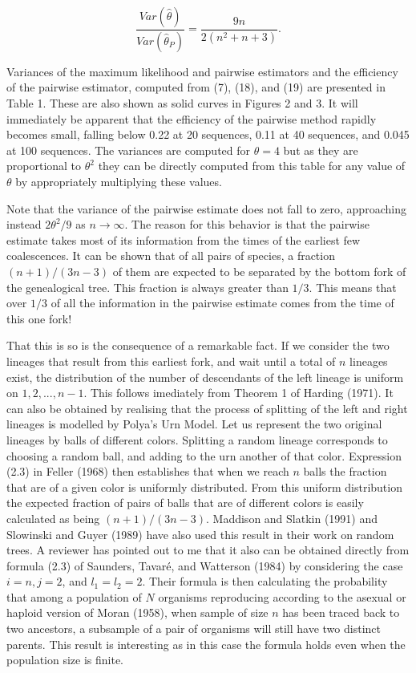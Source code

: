 \begin{equation} %
 \frac{Var(\hat{\theta})}{Var(\hat{\theta}_P)} = \frac{9n}{2(n^2+n+3)}.
\end{equation}

Variances of the maximum likelihood and pairwise estimators
and the efficiency of the pairwise estimator, computed from (7), (18), and (19)
are presented in Table 1.  These are also shown as
solid curves in Figures 2 and 3.  It will immediately be apparent that the
efficiency of the pairwise method rapidly becomes small, falling below 0.22
at 20 sequences, 0.11 at 40 sequences, and 0.045 at 100 sequences.
The variances are computed for $\theta = 4$ but as they are proportional
to $\theta^2$ they can be directly computed from this table for any value
of $\theta$ by appropriately multiplying these values.

Note that the variance of the pairwise estimate does not fall to zero,
approaching instead $2\theta^2/9$ as $n \to \infty$.  The reason for
this behavior is that the pairwise estimate takes most of its
information from the times of the earliest few coalescences.  It can be
shown that of all pairs of species, a fraction $(n+1)/(3n-3)$ of them
are expected to be separated by the bottom fork of the genealogical
tree.  This fraction is always greater than $1/3$.  This means that
over $1/3$ of all the information in the pairwise estimate comes from the
time of this one fork!

That this is so is the consequence of a remarkable fact.  If we consider
the two lineages that result from this earliest fork, and wait until a
total of $n$ lineages exist, the distribution of the number of
descendants of the left lineage is uniform on $1, 2, ..., n-1$.  This
follows imediately from Theorem 1 of Harding (1971).  It can also be
obtained by realising that the process of splitting of the left and
right lineages is modelled by Polya's Urn Model.  Let us represent the
two original lineages by balls of different colors.  Splitting a random
lineage corresponds to choosing a random ball, and adding to the urn
another of that color.  Expression (2.3) in Feller (1968) then
establishes that when we reach $n$ balls the fraction that are
of a given color is uniformly distributed.  From this uniform
distribution the expected fraction of pairs of balls that are of different
colors is easily calculated as being $(n+1)/(3n-3)$.  Maddison and Slatkin
(1991) and Slowinski and Guyer (1989) have also used this result in their work
on random trees.
A reviewer has pointed out to me that it also can be obtained directly
from formula (2.3) of Saunders, Tavar\'{e}, and Watterson (1984) by considering
the case $i = n, j = 2$, and $l_1 = l_2 = 2$.  Their formula is then
calculating
the probability that among a population of $N$ organisms reproducing
according to the asexual or haploid version of Moran (1958), when sample
of size $n$ has been traced back to two ancestors, a subsample of a pair
of organisms will still have two distinct parents.  This result is
interesting as in this case the formula holds even when the population size is
finite.

